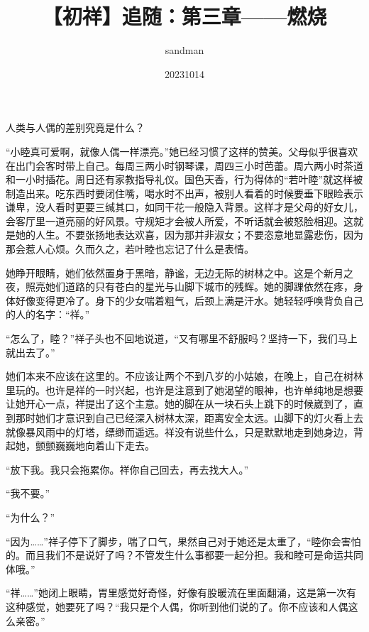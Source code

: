\documentclass{article}
\title{【初祥】追随：第三章——燃烧}
\author{sandman}
\date{20231014}
\begin{document}



\Large

人类与人偶的差别究竟是什么？



“小睦真可爱啊，就像人偶一样漂亮。”她已经习惯了这样的赞美。父母似乎很喜欢在出门会客时带上自己。每周三两小时钢琴课，周四三小时芭蕾。周六两小时茶道和一小时插花。周日还有家教指导礼仪。国色天香，行为得体的“若叶睦”就这样被制造出来。吃东西时要闭住嘴，喝水时不出声，被别人看着的时候要垂下眼睑表示谦卑，没人看时更要三缄其口，如同干花一般隐入背景。这样才是父母的好女儿，会客厅里一道亮丽的好风景。守规矩才会被人所爱，不听话就会被怒脸相迎。这就是她的人生。不要张扬地表达欢喜，因为那并非淑女；不要恣意地显露悲伤，因为那会惹人心烦。久而久之，若叶睦也忘记了什么是表情。



她睁开眼睛，她们依然置身于黑暗，静谧，无边无际的树林之中。这是个新月之夜，照亮她们道路的只有苍白的星光与山脚下城市的残辉。她的脚踝依然在疼，身体好像变得更冷了。身下的少女喘着粗气，后颈上满是汗水。她轻轻呼唤背负自己的人的名字：“祥。”



“怎么了，睦？”祥子头也不回地说道，“又有哪里不舒服吗？坚持一下，我们马上就出去了。”



她们本来不应该在这里的。不应该让两个不到八岁的小姑娘，在晚上，自己在树林里玩的。也许是祥的一时兴起，也许是注意到了她渴望的眼神，也许单纯地是想要让她开心一点，祥提出了这个主意。她的脚在从一块石头上跳下的时候崴到了，直到那时她们才意识到自己已经深入树林太深，距离安全太远。山脚下的灯火看上去就像暴风雨中的灯塔，缥缈而遥远。祥没有说些什么，只是默默地走到她身边，背起她，颤颤巍巍地向着山下走去。



“放下我。我只会拖累你。祥你自己回去，再去找大人。”



“我不要。”



“为什么？”



“因为……”祥子停下了脚步，喘了口气，果然自己对于她还是太重了，“睦你会害怕的。而且我们不是说好了吗？不管发生什么事都要一起分担。我和睦可是命运共同体哦。”



“祥……”她闭上眼睛，胃里感觉好奇怪，好像有股暖流在里面翻涌，这是第一次有这种感觉，她要死了吗？“我只是个人偶，你听到他们说的了。你不应该和人偶这么亲密。”
\end{document}
